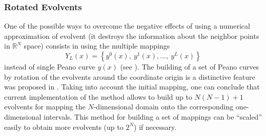 \documentclass{svproc}
\begin{document}
\subsubsection{Rotated Evolvents}
One of the possible ways to overcome the negative effects of using a numerical
approximation of evolvent (it destroys the information about the neighbor points in
$\mathbb{R}^N$ space)
consists in using the multiple mappings
\begin{equation}
  Y_L(x)=\left\{y^0(x),\ y^1(x),...,\ y^L(x)\right\}
\end{equation}
instead of single Peano curve $y(x)$ (see \cite{Strongin2000}).
The building of a set of Peano curves by rotation of the evolvents around the coordinate origin is a
distinctive feature was proposed in \cite{Gergel2009}. Taking into account the initial mapping, one
can conclude that current implementation of the
method allows to build up to $N(N-1)+1$ evolvents for mapping the $N$-dimensional domain
onto the corresponding one-dimensional intervals. This method for building a set of mappings can be
``scaled'' easily to obtain more evolvents (up to
$2^N$) if necessary.
\end{document}

